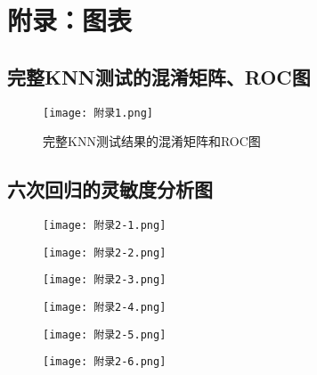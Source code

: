 \section{附录：图表}

\subsection{完整KNN测试的混淆矩阵、ROC图}

\begin{figure}[H] %
	\centering %
	\texttt{[image: 附录1.png]} 
	\caption{完整KNN测试结果的混淆矩阵和ROC图} 
	\label{Fig.main10005} 
\end{figure}

\subsection{六次回归的灵敏度分析图}

\begin{figure}[H] %
	\centering %
	\texttt{[image: 附录2-1.png]} 
	\label{Fig.main10016} 
\end{figure}

\begin{figure}[H] %
	\centering %
	\texttt{[image: 附录2-2.png]} 
	\label{Fig.main1002} 
\end{figure}

\begin{figure}[H] %
	\centering %
	\texttt{[image: 附录2-3.png]} 
	\label{Fig.main1003} 
\end{figure}

\begin{figure}[H] %
	\centering %
	\texttt{[image: 附录2-4.png]} 
	\label{Fig.main1004} 
\end{figure}

\begin{figure}[H] %
	\centering %
	\texttt{[image: 附录2-5.png]} 
	\label{Fig.main1005} 
\end{figure}

\begin{figure}[H] %
	\centering %
	\texttt{[image: 附录2-6.png]} 
	\label{Fig.main1006} 
\end{figure} 


